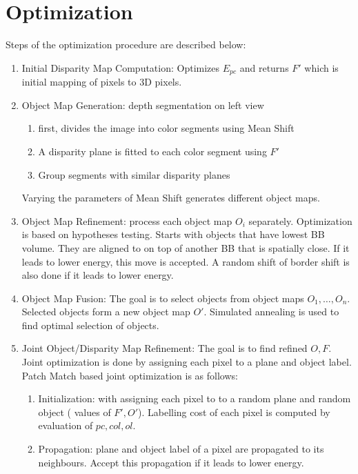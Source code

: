 \documentclass[a4paper,12pt]{article}
\begin{document}
\section{Optimization}
Steps of the optimization procedure are described below:
\begin{enumerate}
\item Initial Disparity Map Computation: Optimizes $E_{pc}$ and returns $F'$ which is initial mapping of pixels to 3D pixels.
\item Object Map Generation: depth segmentation on left view
\begin{enumerate}
\item first, divides the image into color segments using Mean Shift
\item A disparity plane is fitted to each color segment using $F'$
\item Group segments with similar disparity planes
\end{enumerate}
Varying the parameters of Mean Shift generates different object maps.
\item Object Map Refinement: process each object map $O_i$ separately. Optimization is based on hypotheses testing. Starts with objects that have lowest BB volume.  They are aligned to on top of another BB that is spatially close. If it leads to lower energy, this move is accepted. A random shift of border shift is also done if it leads to lower energy.
\item Object Map Fusion: The goal is to select objects from object maps $O_1,\ldots,O_n$. Selected objects form a new object map $O'$. Simulated annealing is used to find optimal selection of objects.
\item Joint Object/Disparity Map Refinement: The goal is to find refined $O,F$. Joint optimization is done by assigning each pixel to a plane and object label. Patch Match based joint optimization is as follows:
\begin{enumerate}
\item Initialization: with assigning each pixel to to a random plane and random object ( values of $F',O'$). Labelling cost of each pixel is computed by evaluation of $pc, col, ol$.
\item Propagation: plane and object label of a pixel are propagated to its neighbours. Accept this propagation if it leads to lower energy.
\end{enumerate} 
\end{enumerate}
\end{document}
